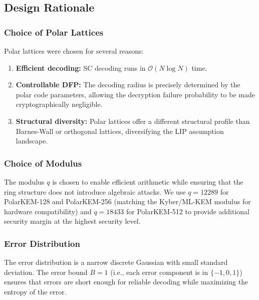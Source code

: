 \documentclass[11pt,a4paper]{article}
\begin{document}
\subsection{Design Rationale}\label{sec:design-rationale}

\subsubsection{Choice of Polar Lattices}

Polar lattices were chosen for several reasons:
\begin{enumerate}[leftmargin=2em]
\item \textbf{Efficient decoding:} SC decoding runs in $\mathcal{O}(N \log N)$ time.
\item \textbf{Controllable DFP:} The decoding radius is precisely determined by the polar code parameters, allowing the decryption failure probability to be made cryptographically negligible.
\item \textbf{Structural diversity:} Polar lattices offer a different structural profile than Barnes-Wall or orthogonal lattices, diversifying the LIP assumption landscape.
\end{enumerate}

\subsubsection{Choice of Modulus}

The modulus $q$ is chosen to enable efficient arithmetic while ensuring that the ring structure does not introduce algebraic attacks. We use $q = 12289$ for \textsf{PolarKEM-128} and \textsf{PolarKEM-256} (matching the Kyber/ML-KEM modulus for hardware compatibility) and $q = 18433$ for \textsf{PolarKEM-512} to provide additional security margin at the highest security level.

\subsubsection{Error Distribution}

The error distribution is a narrow discrete Gaussian with small standard deviation. The error bound $B = 1$ (i.e., each error component is in $\{-1, 0, 1\}$) ensures that errors are short enough for reliable decoding while maximizing the entropy of the error.

\end{document}

